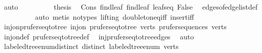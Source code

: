 \begin{isabellebody}
\ auto\isanewline
\ \ \ \ \ \ \isamarkupfalse%
\ \isamarkupfalse%
\ {\isacharquery}{\kern0pt}thesis\ \isamarkupfalse%
\ Cons{\isacharparenleft}{\kern0pt}{}{\isacharparenright}{\kern0pt}\ find{\isacharunderscore}{\kern0pt}leaf\ find{\isacharunderscore}{\kern0pt}leaf{}\ leafs{\isacharunderscore}{\kern0pt}eq\ False\ \isamarkupfalse%
\ edges{\isacharunderscore}{\kern0pt}of{\isacharunderscore}{\kern0pt}edge{\isacharunderscore}{\kern0pt}list{\isacharunderscore}{\kern0pt}def\isanewline
\ \ \ \ \ \ \ \ \isamarkupfalse%
\ {\isacharparenleft}{\kern0pt}auto{\isacharcomma}{\kern0pt}\ metis\ {\isacharparenleft}{\kern0pt}no{\isacharunderscore}{\kern0pt}types{\isacharcomma}{\kern0pt}\ lifting{\isacharparenright}{\kern0pt}\ doubleton{\isacharunderscore}{\kern0pt}eq{\isacharunderscore}{\kern0pt}iff\ insert{\isacharunderscore}{\kern0pt}iff{\isacharparenright}{\kern0pt}\isanewline
\ \ \ \ \isamarkupfalse%
\isanewline
\ \ \isamarkupfalse%
\isanewline
{}\isamarkupfalse%
%
\endisatagproof
{\isafoldproof}%
%
\isadelimproof
\isanewline
%
\endisadelimproof
\isanewline
{}\isamarkupfalse%
\ inj{\isacharunderscore}{\kern0pt}on{\isacharunderscore}{\kern0pt}prufer{\isacharunderscore}{\kern0pt}seq{\isacharunderscore}{\kern0pt}to{\isacharunderscore}{\kern0pt}tree{\isacharcolon}{\kern0pt}\ {\isachardoublequoteopen}inj{\isacharunderscore}{\kern0pt}on\ {\isacharparenleft}{\kern0pt}prufer{\isacharunderscore}{\kern0pt}seq{\isacharunderscore}{\kern0pt}to{\isacharunderscore}{\kern0pt}tree\ verts{\isacharparenright}{\kern0pt}\ {\isacharparenleft}{\kern0pt}prufer{\isacharunderscore}{\kern0pt}sequences\ verts{\isacharparenright}{\kern0pt}{\isachardoublequoteclose}\isanewline
%
\isadelimproof
\ \ %
\endisadelimproof
%
\isatagproof
{}\isamarkupfalse%
\ inj{\isacharunderscore}{\kern0pt}on{\isacharunderscore}{\kern0pt}def\ prufer{\isacharunderscore}{\kern0pt}seq{\isacharunderscore}{\kern0pt}to{\isacharunderscore}{\kern0pt}tree{\isacharunderscore}{\kern0pt}def\ \isamarkupfalse%
\ inj{\isacharunderscore}{\kern0pt}prufer{\isacharunderscore}{\kern0pt}seq{\isacharunderscore}{\kern0pt}to{\isacharunderscore}{\kern0pt}tree{\isacharunderscore}{\kern0pt}edges\ \isamarkupfalse%
\ auto%
\endisatagproof
{\isafoldproof}%
%
\isadelimproof
\isanewline
%
\endisadelimproof
\isanewline
{}\isamarkupfalse%
\ labeled{\isacharunderscore}{\kern0pt}tree{\isacharunderscore}{\kern0pt}enum{\isacharunderscore}{\kern0pt}distinct{\isacharcolon}{\kern0pt}\ {\isachardoublequoteopen}distinct\ {\isacharparenleft}{\kern0pt}labeled{\isacharunderscore}{\kern0pt}tree{\isacharunderscore}{\kern0pt}enum\ verts{\isacharparenright}{\kern0pt}{\isachardoublequoteclose}\isanewline

\end{isabellebody}
